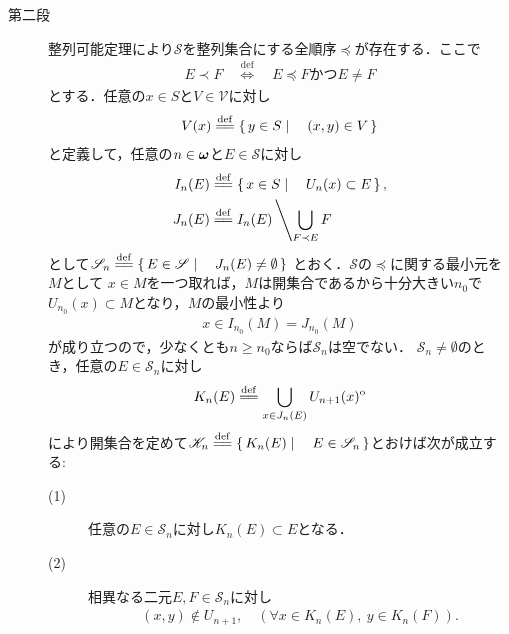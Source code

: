 \begin{prf}
\begin{description}
			\item[第二段]
				整列可能定理により$\mathscr{S}$を整列集合にする全順序$\preceq$が存在する．ここで
				\begin{align}
					E \prec F \quad \overset{\mathrm{def}}{\Longleftrightarrow} \quad
					\mbox{$E \preceq F$かつ$E \neq F$}
				\end{align}
				とする．任意の$x \in S$と$V \in \mathscr{V}$に対し
				\begin{align}
					V(x) \defeq \Set{y \in S}{(x,y) \in V}
				\end{align}
				と定義して，任意の$n \in {\boldsymbol \omega}$と$E \in \mathscr{S}$に対し
				\begin{align}
					I_n(E) &\defeq \Set{x \in S}{U_n(x) \subset E}, \\
					J_n(E) &\defeq I_n(E) \left\backslash \bigcup_{F \prec E}F \right.
				\end{align}
				として$\mathscr{S}_n \defeq \Set{E \in \mathscr{S}}{J_n(E) \neq \emptyset}$
				とおく．$\mathscr{S}$の$\preceq$に関する最小元を$M$として
				$x \in M$を一つ取れば，$M$は開集合であるから十分大きい$n_0$で
				$U_{n_0}(x) \subset M$となり，$M$の最小性より
				\begin{align}
					x \in I_{n_0}(M) = J_{n_0}(M)
				\end{align}
				が成り立つので，少なくとも$n \geq n_0$ならば$\mathscr{S}_n$は空でない．
				$\mathscr{S}_n \neq \emptyset$のとき，任意の$E \in \mathscr{S}_n$に対し
				\begin{align}
					K_n(E) \defeq \bigcup_{x \in J_n(E)} U_{n+1}(x)^{\mathrm{o}}
				\end{align}
				により開集合を定めて$\mathscr{K}_n \defeq 
				\Set{K_n(E)}{E \in \mathscr{S}_n}$とおけば次が成立する:
				\begin{description}
					\item[(1)] 任意の$E \in \mathscr{S}_n$に対し$K_n(E) \subset E$となる．
					
					\item[(2)] 相異なる二元$E, F \in \mathscr{S}_n$に対し
						\begin{align}
							(x,y) \notin U_{n+1},\quad
							(\forall x \in K_n(E),\ y \in K_n(F)).
						\end{align}
						

\end{description}
\end{description}
\end{prf}
